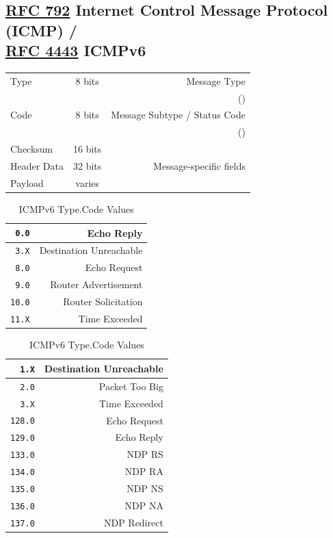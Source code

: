 \documentclass[12pt]{article}
\newcommand{\RFC}[1]{\href{https://datatracker.ietf.org/doc/html/rfc#1}{RFC #1}}
\begin{document}
	\subsection[RFC 792 ICMP / RFC 4443 ICMPv6]{\RFC{792} Internet Control Message Protocol (ICMP) /\\\RFC{4443} ICMPv6 \label{subsec:ICMP}}
	\begin{table}[H]
	\centering
	\begin{tabular}{| l | c | r |}
	\hline
	Type			& 8 bits	& Message Type\\
				&		& (\Cref{tab:ICMP VALUES,tab:ICMPV6 VALUES}) \\\hline
	Code			& 8 bits	& Message Subtype / Status Code\\
				&		& (\Cref{tab:ICMP VALUES,tab:ICMPV6 VALUES})\\\hline
	Checksum		& 16 bits	&\\\hline
	Header Data	& 32 bits	& Message-specific fields\\\hline
	Payload		& varies	&\\\hline
	\end{tabular}\end{table}

	\begin{table}[H]
	\begin{minipage}{.45\linewidth}
	\centering
	\caption{ICMP Type.Code Values \label{tab:ICMP VALUES}}
	\begin{tabular}{| r | r |}
	\hline
	\texttt{0.0}	& Echo Reply\\\hline
	\texttt{3.X} 	& Destination Unreachable\\\hline
	\texttt{8.0}	& Echo Request\\\hline
	\texttt{9.0}	& Router Advertisement\\
	\texttt{10.0}	& Router Solicitation\\\hline
	\texttt{11.X} & Time Exceeded\\\hline
	\end{tabular}\end{minipage}\hfill
	\begin{minipage}{.45\linewidth}
	\centering
	\caption{ICMPv6 Type.Code Values\label{tab:ICMPV6 VALUES}}
	\begin{tabular}{| r | r |}
	\hline
	\texttt{1.X}	 	& Destination Unreachable\\\hline
	\texttt{2.0}		& Packet Too Big\\\hline
	\texttt{3.X}	 	& Time Exceeded\\\hline
	\texttt{128.0}	& Echo Request\\
	\texttt{129.0}	& Echo Reply\\\hline
	\texttt{133.0}	& NDP RS\\
	\texttt{134.0}	& NDP RA\\
	\texttt{135.0}	& NDP NS\\
	\texttt{136.0}	& NDP NA\\
	\texttt{137.0}	& NDP Redirect\\\hline
	\end{tabular}\end{minipage}\end{table}
\end{document}

